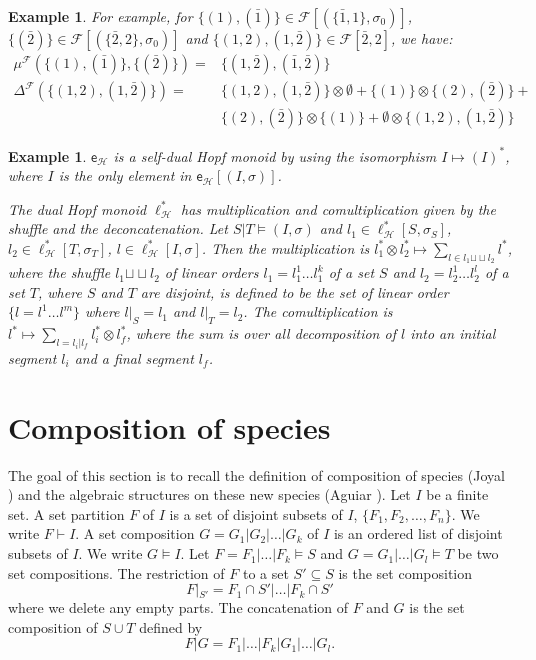 \documentclass[11pt,reqno]{amsart}
\numberwithin{equation}{section}
\newtheorem{ex}[theorem]{Example}
\def\H{{\mathcal{H}}}
\def\eB{{\textsf{e}_{\H}}}
\def\lB{\ell_{\H}}
\def\F{\mathcal{F}}
\def\shuf{{\sqcup\!\sqcup}}
\begin{document}
\begin{ex}
For example, for $\{(1),(\bar{1})\}\in \F[(\{\bar{1},1\},\sigma_0)]$, $\{(\bar{2})\}\in \F[(\{\bar{2},2\},\sigma_0)]$ and $\{(1,2),(1,\bar{2})\}\in \F[\bar{2},2]$, we have:
\begin{equation*}
\begin{aligned}
\mu^{\F}(\{(1),(\bar{1})\},\{(\bar{2})\}) =& \{ (1,\bar{2}),(\bar{1},\bar{2})\}\\
\Delta^{\F}(\{(1,2),(1,\bar{2})\}) =&\{(1,2),(1,\bar{2})\}\otimes \emptyset + \{(1)\}\otimes \{(2),(\bar{2})\} + \\
& \{(2),(\bar{2})\}\otimes \{(1)\} + \emptyset\otimes \{(1,2),(1,\bar{2})\}
\end{aligned}
\end{equation*}

\end{ex}




\begin{ex}
$\eB$ is a self-dual Hopf monoid by using the isomorphism $I\mapsto (I)^{\ast}$, where $I$ is the only element in $\eB[(I,\sigma)]$. 

The dual Hopf monoid $\lB^{\ast}$ has multiplication and comultiplication given by the shuffle and the deconcatenation. Let $S|T\models (I,\sigma)$ and $l_1\in \lB^{\ast}[S,\sigma_S]$, $l_2\in \lB^{\ast}[T,\sigma_T]$, $l\in \lB^{\ast}[I,\sigma]$. Then the multiplication is $l_1^{\ast}\otimes l_2^{\ast}\mapsto \sum_{l\in l_1\shuf l_2} l^{\ast}$, where the shuffle $l_1\shuf l_2$ of linear orders $l_1=l_1^1\dots l_1^k$ of a set $S$ and $l_2=l_2^1\dots l_2^l$ of a set $T$, where $S$ and $T$ are disjoint, is defined to be the set of linear order $\{l=l^1\dots l^m\}$ where $l|_S=l_1$ and $l|_T=l_2$. The comultiplication is $l^{\ast}\mapsto \sum_{l=l_i|l_f} l_i^{\ast}\otimes l_f^{\ast}$, where the sum is over all decomposition of $l$ into an initial segment $l_i$ and a final segment $l_f$.
\end{ex}





\section{Composition of species}

The goal of this section is to recall the definition of composition of species (Joyal \cite{Joyal}) and the algebraic structures on these new species (Aguiar \cite{Aguiar}). Let $I$ be a finite set. A set partition $F$ of $I$ is a set of disjoint subsets of $I$, $\{F_1,F_2,\dots, F_n\}$. We write $F\vdash I$. A set composition $G=G_1|G_2|\dots|G_k$ of $I$ is an ordered list of disjoint subsets of $I$. We write $G\models I$. 
Let $F=F_1|\dots|F_k\models S$ and $G=G_1|\dots|G_l \models T$ be two set compositions. The restriction of $F$ to a set $S'\subseteq S$ is the set composition
$$F|_{S'}=F_1\cap S'|\dots|F_k\cap S'$$
where we delete any empty parts. The concatenation of $F$ and $G$ is the set composition of $S\cup T$ defined by
$$F|G=F_1|\dots|F_k|G_1|\dots|G_l.$$
\end{document}
